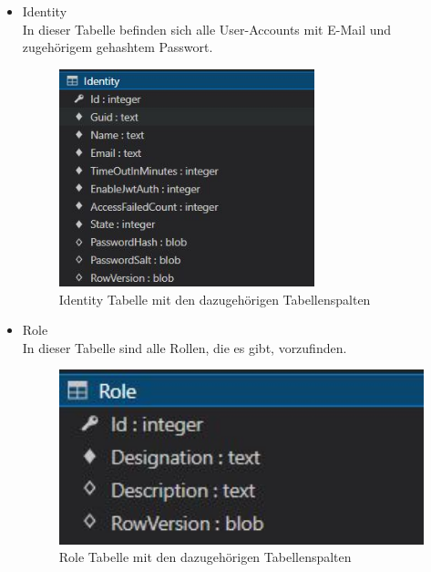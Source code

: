 \begin{itemize}
    \item Identity\\
    In dieser Tabelle befinden sich alle User-Accounts mit E-Mail und zugehörigem gehashtem Passwort.

    \begin{figure}[H]
        \centering
        \includegraphics[width=0.7\textwidth]{pics/IdentityTableStructur.JPG}
        \caption{Identity Tabelle mit den dazugehörigen Tabellenspalten}
    \end{figure}

\end{itemize}


\begin{itemize}
    \item Role\\
    In dieser Tabelle sind alle Rollen, die es gibt, vorzufinden.

    \begin{figure}[H]
        \centering
        \includegraphics[width=1\textwidth]{pics/RoleTableStructure.JPG}
        \caption{Role Tabelle mit den dazugehörigen Tabellenspalten}
    \end{figure}

\end{itemize}

